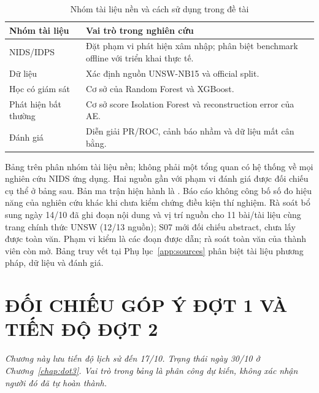\documentclass[12pt,a4paper,oneside]{report}
\begin{document}
\begin{table}[H]\centering\small
\caption{Nhóm tài liệu nền và cách sử dụng trong đề tài}
\begin{tabularx}{\textwidth}{L{4.7cm}Y}\toprule
Nhóm tài liệu & Vai trò trong nghiên cứu\\\midrule
NIDS/IDPS \cite{nist80094,sommer2010} & Đặt phạm vi phát hiện xâm nhập; phân biệt benchmark offline với triển khai thực tế.\\
Dữ liệu \cite{moustafa2015,moustafa2016,unswsite} & Xác định nguồn UNSW-NB15 và official split.\\
Học có giám sát \cite{breiman2001,chen2016} & Cơ sở của Random Forest và XGBoost.\\
Phát hiện bất thường \cite{liu2008,sakurada2014,chandola2009} & Cơ sở score Isolation Forest và reconstruction error của AE.\\
Đánh giá \cite{saito2015,davis2006,fawcett2006} & Diễn giải PR/ROC, cảnh báo nhầm và dữ liệu mất cân bằng.\\
\bottomrule\end{tabularx}\end{table}

Bảng trên phân nhóm tài liệu nền; không phải một tổng quan có hệ thống về mọi nghiên cứu NIDS ứng dụng. Hai nguồn gần với phạm vi đánh giá được đối chiếu cụ thể ở bảng sau. Bản ma trận hiện hành là . Báo cáo không công bố số đo hiệu năng của nghiên cứu khác khi chưa kiểm chứng điều kiện thí nghiệm. Rà soát bổ sung ngày 14/10 đã ghi đoạn nội dung và vị trí nguồn cho 11 bài/tài liệu cùng trang chính thức UNSW (12/13 nguồn); S07 mới đối chiếu abstract, chưa lấy được toàn văn. Phạm vi kiểm là các đoạn được dẫn; rà soát toàn văn của thành viên còn mở. Bảng truy vết tại Phụ lục~\ref{app:sources} phân biệt tài liệu phương pháp, dữ liệu và đánh giá.



\chapter{ĐỐI CHIẾU GÓP Ý ĐỢT 1 VÀ TIẾN ĐỘ ĐỢT 2}
\noindent\textit{Chương này lưu tiến độ lịch sử đến 17/10. Trạng thái ngày 30/10 ở Chương~\ref{chap:dot3}. Vai trò trong bảng là phân công dự kiến, không xác nhận người đó đã tự hoàn thành.}\par
\end{document}
